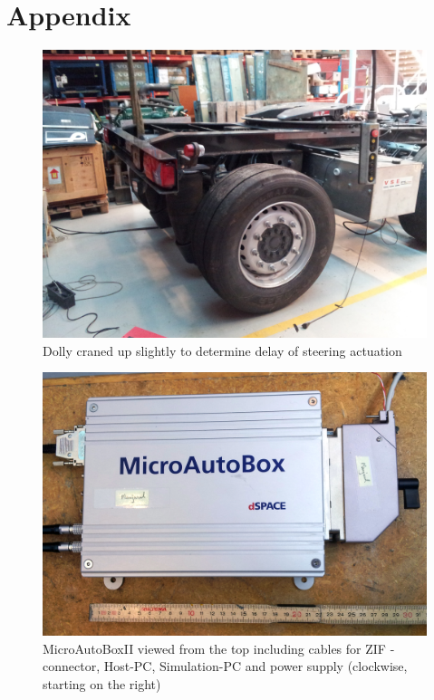 \documentclass[ExampleMasters.tex]{subfiles}
\begin{document}
\clearpage
{\pagestyle{empty}\cleardoublepage}%

\appendix 
\chapter{Appendix}
\label{chap:Appendix}

\begin{figure}[h]
\centering
\includegraphics[width=1\linewidth]{figures/dolly_craned_up}
\caption{Dolly craned up slightly to determine delay of steering actuation}
\label{fig:dolly_craned_up}
\end{figure}

\begin{figure}[h]
	\centering
	\includegraphics[width=1\linewidth]{figures/MABII_topview_cropped}
	\caption{MicroAutoBoxII viewed from the top including cables for \gls{ZIF} -connector, Host-PC, Simulation-PC and power supply (clockwise, starting on the right)}
	\label{fig:microautobox_topview}
\end{figure}
\end{document}
